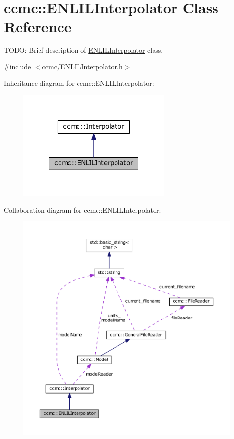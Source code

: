 \hypertarget{classccmc_1_1_e_n_l_i_l_interpolator}{\section{ccmc\-:\-:E\-N\-L\-I\-L\-Interpolator Class Reference}
\label{classccmc_1_1_e_n_l_i_l_interpolator}
}


T\-O\-D\-O\-: Brief description of \hyperlink{classccmc_1_1_e_n_l_i_l_interpolator}{E\-N\-L\-I\-L\-Interpolator} class.  




{\ttfamily \#include $<$ccmc/\-E\-N\-L\-I\-L\-Interpolator.\-h$>$}



Inheritance diagram for ccmc\-:\-:E\-N\-L\-I\-L\-Interpolator\-:\nopagebreak
\begin{figure}[H]
\begin{center}
\leavevmode
\includegraphics[width=216pt]{classccmc_1_1_e_n_l_i_l_interpolator__inherit__graph}
\end{center}
\end{figure}


Collaboration diagram for ccmc\-:\-:E\-N\-L\-I\-L\-Interpolator\-:\nopagebreak
\begin{figure}[H]
\begin{center}
\leavevmode
\includegraphics[width=350pt]{classccmc_1_1_e_n_l_i_l_interpolator__coll__graph}
\end{center}
\end{figure}
